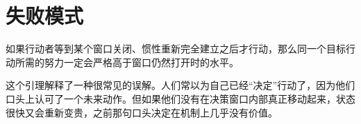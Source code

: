 \section{失败模式}

\begin{lemma}[延迟响应失败]
如果行动者等到某个窗口关闭、惯性重新完全建立之后才行动，那么同一个目标行动所需的努力一定会严格高于窗口仍然打开时的水平。
\end{lemma}

\begin{discussion}
这个引理解释了一种很常见的误解。人们常以为自己已经“决定”行动了，因为他们口头上认可了一个未来动作。但如果他们没有在决策窗口内部真正移动起来，状态很快又会重新变贵，之前那句口头决定在机制上几乎没有价值。
\end{discussion}